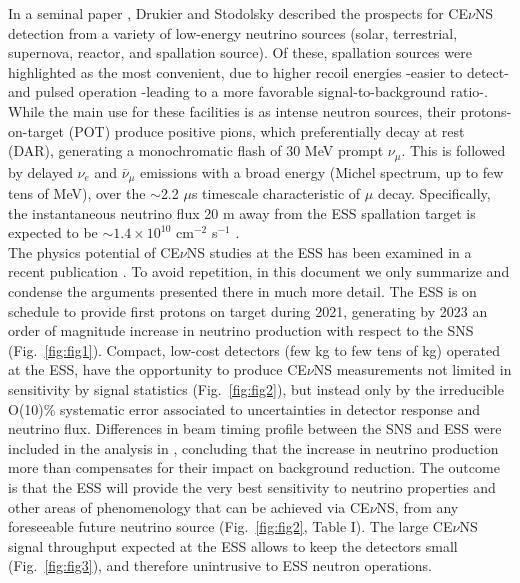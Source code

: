 \documentclass[12pt]{article}
\begin{document}
In a seminal paper \cite{leo}, Drukier and Stodolsky described the prospects for CE$\nu$NS detection from a variety of low-energy neutrino sources (solar, terrestrial, supernova, reactor, and spallation source). Of these, spallation sources were highlighted as the most convenient, due to higher recoil energies -easier to detect- and pulsed operation -leading to a more favorable signal-to-background ratio-. While the main use for these facilities is as intense neutron sources, their protons-on-target (POT) produce positive pions, which preferentially decay at rest (DAR), generating a monochromatic flash of 30 MeV prompt $\nu_{\mu}$. This is followed by delayed  $\nu_{e}$ and $\bar{\nu}_{\mu}$ emissions with a broad energy (Michel spectrum, up to few tens of MeV), over the $\sim$2.2 $\mu$s timescale characteristic of $\mu$ decay. Specifically, the instantaneous neutrino flux 20 m away from the ESS spallation target is expected to be $\sim 1.4\times10^{10}$ cm$^{-2}$ s$^{-1}$ \cite{ESS}.\\


The physics potential of CE$\nu$NS studies at the ESS has been examined in a recent publication \cite{ESS}. To avoid repetition, in this document we only summarize and condense the arguments presented there in much more detail. The ESS is on schedule to provide first protons on target during 2021, generating by 2023 an order of magnitude increase in neutrino production with respect to the SNS (Fig.\ \ref{fig:fig1}).  Compact, low-cost detectors (few kg to few tens of kg) operated at the ESS, have the opportunity to produce CE$\nu$NS measurements not limited in sensitivity by signal statistics (Fig.\ \ref{fig:fig2}), but instead only  by the irreducible O(10)\%  systematic error associated to uncertainties in detector response and neutrino flux.  Differences in beam timing profile between the SNS and ESS were included in the analysis in \cite{ESS}, concluding that the increase in neutrino production more than compensates for their impact on background reduction. The outcome is that the ESS will provide the very best sensitivity to neutrino properties and other areas of phenomenology that can be achieved via CE$\nu$NS, from any foreseeable future neutrino source (Fig.\ \ref{fig:fig2}, Table I). The large CE$\nu$NS signal throughput expected at the ESS allows to keep the detectors small (Fig.\ \ref{fig:fig3}), and therefore unintrusive to ESS neutron operations.\\
\end{document}
